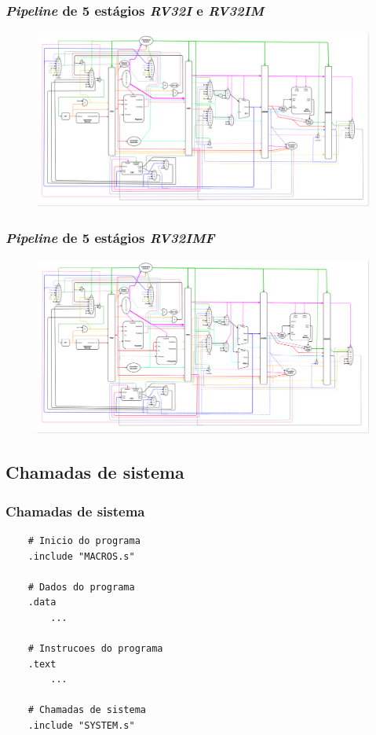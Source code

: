 \documentclass[aspectratio=169]{beamer}
\begin{document}
    \begin{frame}
        \frametitle{\textit{Pipeline} de 5 estágios \textit{RV32I} e \textit{RV32IM}}
        \vfill
        \begin{figure}[H]
        \centering
            \includegraphics[width=.99\textwidth,height=.85\textheight,keepaspectratio]
            {../images/uarch_diagrams/pipeline-RV32I-RV32IM.png}
        \end{figure}
        \vfill
    \end{frame}

    \begin{frame}
        \frametitle{\textit{Pipeline} de 5 estágios \textit{RV32IMF}}
        \vfill
        \begin{figure}[H]
        \centering
            \includegraphics[width=.99\textwidth,height=.85\textheight,keepaspectratio]
            {../images/uarch_diagrams/pipeline-RV32IMF.png}
        \end{figure}
        \vfill
    \end{frame}

    \subsection{Chamadas de sistema}
    \begin{frame}[fragile]
        \frametitle{Chamadas de sistema}
        \vfill
        \begin{lstlisting}
    # Inicio do programa
    .include "MACROS.s"

    # Dados do programa
    .data
        ...

    # Instrucoes do programa
    .text
        ...

    # Chamadas de sistema
    .include "SYSTEM.s"
        \end{lstlisting}
        \vfill
    \end{frame}
\end{document}
